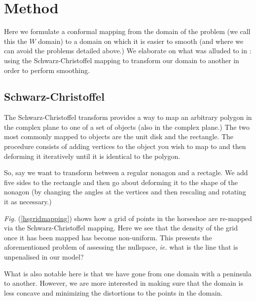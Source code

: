 \documentclass[a4paper,10pt]{amsart}
\newcommand{\sch}{Schwarz-Christoffel }
\newcommand{\Fig}[1]{\emph{Fig.} (\ref{#1})}
\begin{document}
\section{Method}

Here we formulate a conformal mapping from the domain of the problem (we call this the $W$ domain) to a domain on which it is easier to smooth (and where we can avoid the problems detailed above.) We elaborate on what was alluded to in \cite{eilerstalk}: using the \sch mapping to transform our domain to another in order to perform smoothing.

\subsection{\sch}

The \sch transform provides a way to map an arbitrary polygon in the complex plane to one of a set of objects (also in the complex plane.) The two most commonly mapped to objects are the unit disk and the rectangle. The procedure consists of adding vertices to the object you wish to map to and then deforming it iteratively until it is identical to the polygon.

So, say we want to transform between a regular nonagon and a rectagle. We add five sides to the rectangle and then go about deforming it to the shape of the nonagon (by changing the angles at the vertices and then rescaling and rotating it as necessary.) 

\Fig{hsgridmapping} shows how a grid of points in the horseshoe are re-mapped via the \sch mapping. Here we see that the density of the grid once it has been mapped has become non-uniform. This presents the aforementioned problem of assessing the nullspace, \emph{ie.} what is the line that is unpenalised in our model?

What is also notable here is that we have gone from one domain with a peninsula to another. However, we are more interested in making sure that the domain is less concave and minimizing the distortions to the points in the domain.
\end{document}
